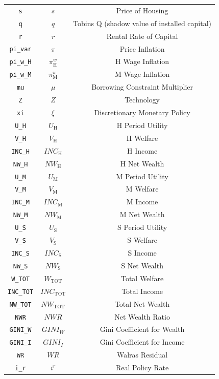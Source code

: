 \begin{center}
\begin{longtable}{ccc}
\texttt{s} & $s$ & Price of Housing\\
\texttt{q} & $q$ & Tobins Q (shadow value of installed capital)\\
\texttt{r} & $r$ & Rental Rate of Capital\\
\texttt{pi\_var} & $\pi$ & Price Inflation\\
\texttt{pi\_w\_H} & $\pi^w_\mathrm{H}$ & H Wage Inflation\\
\texttt{pi\_w\_M} & $\pi^w_\mathrm{M}$ & M Wage Inflation\\
\texttt{mu} & $\mu$ & Borrowing Constraint Multiplier\\
\texttt{Z} & $Z$ & Technology\\
\texttt{xi} & $\xi$ & Discretionary Monetary Policy\\
\texttt{U\_H} & $U_\mathrm{H}$ & H Period Utility\\
\texttt{V\_H} & $V_\mathrm{H}$ & H Welfare\\
\texttt{INC\_H} & $INC_\mathrm{H}$ & H Income\\
\texttt{NW\_H} & $NW_\mathrm{H}$ & H Net Wealth\\
\texttt{U\_M} & $U_\mathrm{M}$ & M Period Utility\\
\texttt{V\_M} & $V_\mathrm{M}$ & M Welfare\\
\texttt{INC\_M} & $INC_\mathrm{M}$ & M Income\\
\texttt{NW\_M} & $NW_\mathrm{M}$ & M Net Wealth\\
\texttt{U\_S} & $U_\mathrm{S}$ & S Period Utility\\
\texttt{V\_S} & $V_\mathrm{S}$ & S Welfare\\
\texttt{INC\_S} & $INC_\mathrm{S}$ & S Income\\
\texttt{NW\_S} & $NW_\mathrm{S}$ & S Net Wealth\\
\texttt{W\_TOT} & $W_\mathrm{TOT}$ & Total Welfare\\
\texttt{INC\_TOT} & $INC_\mathrm{TOT}$ & Total Income\\
\texttt{NW\_TOT} & $NW_\mathrm{TOT}$ & Total Net Wealth\\
\texttt{NWR} & $NWR$ & Net Wealth Ratio\\
\texttt{GINI\_W} & $GINI_W$ & Gini Coefficient for Wealth\\
\texttt{GINI\_I} & $GINI_I$ & Gini Coefficient for Income\\
\texttt{WR} & $WR$ & Walras Residual\\
\texttt{i\_r} & $i^r$ & Real Policy Rate\\

\end{longtable}
\end{center}
